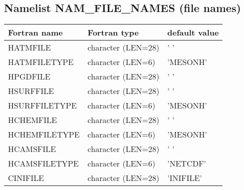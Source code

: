 \subsection{Namelist NAM\_FILE\_NAMES (file names)}\label{s:namfilenames}

\begin{center}
\begin{tabular} {|l|l|l|}
\hline
Fortran name & Fortran type & default value\\
\hline
\hline
HATMFILE      & character (LEN=28) & ' '           \\
HATMFILETYPE  & character (LEN=6)  & 'MESONH'      \\
HPGDFILE      & character (LEN=28) & ' '           \\
HSURFFILE     & character (LEN=28) & ' '           \\
HSURFFILETYPE & character (LEN=6)  & 'MESONH'      \\
HCHEMFILE     & character (LEN=28) & ' '           \\
HCHEMFILETYPE & character (LEN=6)  & 'MESONH'      \\
HCAMSFILE     & character (LEN=28) & ' '           \\
HCAMSFILETYPE & character (LEN=6)  & 'NETCDF'      \\
CINIFILE      & character (LEN=28) & 'INIFILE'     \\

\hline
\end{tabular}
\end{center}

